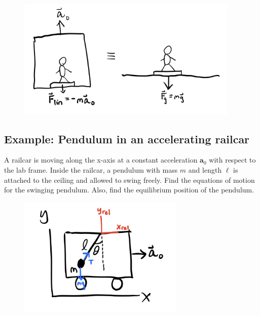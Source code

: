 \documentclass[
  letterpaper,
  DIV=11,
  numbers=noendperiod]{scrreprt}
\begin{document}
\begin{figure}

{\centering \includegraphics[width=4.16667in,height=\textheight]{classical-mechanics/./resources/image-20230217104903472.png}

}

\end{figure}

\hypertarget{example-pendulum-in-an-accelerating-railcar}{%
\subsection{Example: Pendulum in an accelerating
railcar}\label{example-pendulum-in-an-accelerating-railcar}}

A railcar is moving along the x-axis at a constant acceleration
\(\mathbf{a}_0\) with respect to the lab frame. Inside the railcar, a
pendulum with mass \(m\) and length \(\ell\) is attached to the ceiling
and allowed to swing freely. Find the equations of motion for the
swinging pendulum. Also, find the equilibrium position of the pendulum.

\begin{figure}

{\centering \includegraphics[width=3.125in,height=\textheight]{classical-mechanics/./resources/image-20230217105357519.png}

}

\end{figure}
\end{document}
